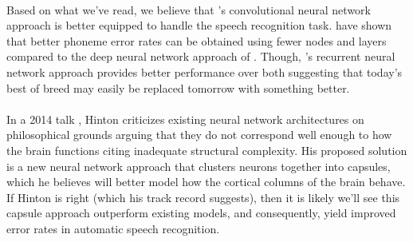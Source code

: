 \documentclass[letterpaper]{article}
\begin{document}
\paragraph{} Based on what we've read, we believe that \cite{DBLP:journals/taslp/Abdel-HamidMJDPY14}'s convolutional neural network approach is better equipped to handle the speech recognition task. \cite{DBLP:journals/taslp/Abdel-HamidMJDPY14} have shown that better phoneme error rates can be obtained using fewer nodes and layers compared to the deep neural network approach of \cite{DBLP:journals/taslp/DahlYDA12}. Though, \cite{DBLP:conf/icassp/GravesMH13}'s recurrent neural network approach provides better performance over both suggesting that today's best of breed may easily be replaced tomorrow with something better.

\paragraph{} In a 2014 talk \cite{self:hinton14}, Hinton criticizes existing neural network architectures on philosophical grounds arguing that they do not correspond well enough to how the brain functions citing inadequate structural complexity. His proposed solution is a new neural network approach that clusters neurons together into capsules, which he believes will better model how the cortical columns of the brain behave. If Hinton is right (which his track record suggests), then it is likely we'll see this capsule approach outperform existing models, and consequently, yield improved error rates in automatic speech recognition.




\appendix

\singlespacing



\end{document}
